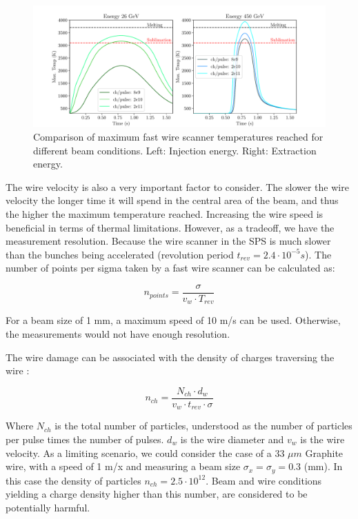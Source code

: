 \begin{figure}[h]
    \centering
    \includegraphics[width=1.0\columnwidth]{WireScanner_Limits/WireLim1.pdf}
    \caption{Comparison of maximum fast wire scanner temperatures reached for different beam conditions. Left: Injection energy. Right: Extraction energy.}
    \label{fig:WireScanner1}
\end{figure}

The wire velocity is also a very important factor to consider. The slower the wire velocity the longer time it will spend in the central area of the beam, and thus the higher the maximum temperature reached. Increasing the wire speed is beneficial in terms of thermal limitations. However, as a tradeoff, we have the measurement resolution. Because the wire scanner in the SPS is much slower than the bunches being accelerated (revolution period $t_{rev} = 2.4\cdot 10^{-5} s$). The number of points per sigma taken by a fast wire scanner can be calculated as: 

\begin{equation}
    n_{points} = \frac{\sigma}{v_{w}\cdot T_{rev}}
\end{equation}

For a beam size of 1 mm, a maximum speed of 10 m/s can be used. Otherwise, the measurements would not have enough resolution. 

The wire damage can be associated with the density of charges traversing the wire \parencite[][]{ref:Msapinski}:

\begin{equation}
     n_{ch} = \frac{N_{ch} \cdot d_{w}}{v_{w} \cdot t_{rev} \cdot \sigma}
\end{equation}

Where $N_{ch}$ is the total number of particles, understood as the number of particles per pulse times the number of pulses. $d_w$ is the wire diameter and $v_w$ is the wire velocity. As a limiting scenario, we could consider the case of a 33 $\mu m$ Graphite wire, with a speed of 1 m/x and measuring a beam size $\sigma_x = \sigma_y = 0.3$ (mm).   In this case the density of particles $n_{ch} = 2.5\cdot 10^{12}$. Beam and wire conditions yielding a charge density higher than this number, are considered to be potentially harmful.

